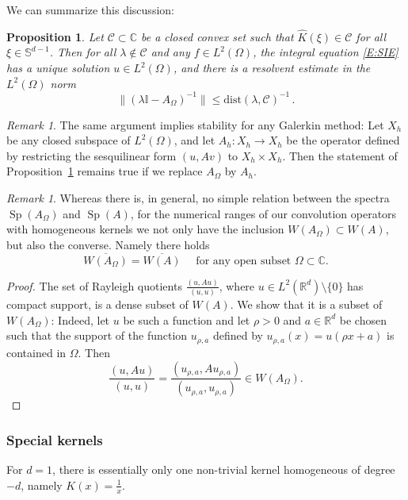\documentclass[12pt]{amsart}
\newtheorem{proposition}[theorem]{Proposition}
\theoremstyle{definition}
\theoremstyle{remark}
\newtheorem{remark}[theorem]{Remark}
\numberwithin{equation}{section}
\newcommand\C{{\mathbb C}}
\newcommand\R{{\mathbb R}}
\renewcommand\SS{{\mathbb S}}
\newcommand\cC{{\mathcal{C}}}
\newcommand {\Id}{\mathbb I}
\newcommand{\dist}{\mathrm{dist}}
\newcommand{\Sp}{\mathop{\mathrm{Sp}}\nolimits}
\let\hat=\widehat
\begin{document}
We can summarize this discussion:
\begin{proposition}
 \label{P:W(AOmega)}
 Let $\cC\subset\C$ be a closed convex set such that 
 $\hat K(\xi)\in \cC$ for all $\xi\in \SS^{d-1}$. Then for all $\lambda\not\in\cC$ and any $f\in L^{2}(\Omega)$, the integral equation \eqref{E:SIE} has a unique solution $u\in L^{2}(\Omega)$, and there is a resolvent estimate in the $L^{2}(\Omega)$ norm
\begin{equation}
\label{E:resAOmega}
 \|(\lambda\Id-A_{\Omega})^{-1}\| \le \dist(\lambda,\cC)^{-1}\,.
\end{equation}
\end{proposition}
\begin{remark}
 \label{R:StabGal}
The same argument implies stability for any Galerkin method: Let $X_{h}$ be any closed subspace of $L^{2}(\Omega)$, and let $A_{h}:X_{h}\to X_{h}$ be the operator defined by restricting the sesquilinear form $(u,Av)$ to $X_{h}\times X_{h}$. Then the statement of Proposition~\ref{P:W(AOmega)} remains true if we replace $A_{\Omega}$ by $A_{h}$.
\end{remark}
\begin{remark}
 \label{R:WAOmega=WA}
 Whereas there is, in general, no simple relation between the spectra $\Sp(A_{\Omega})$ and $\Sp(A)$, for the numerical ranges of our convolution operators with homogeneous kernels we not only have the inclusion
 $W(A_{\Omega})\subset W(A)$, but also the converse. Namely there holds
 \begin{equation}
\label{E:WAOmega=WA}
  \overline{W(A_{\Omega})} = \overline{W(A)}\quad\mbox{ for any open subset $\Omega\subset\C$.}
 \end{equation}
\begin{proof}
  The set of Rayleigh quotients $\frac{(u,Au)}{(u,u)}$, where 
  $u\in L^{2}(\R^{d})\setminus\{0\}$ has compact support, is a dense subset of $W(A)$. 
 We show that it is a subset of $W(A_{\Omega})$: Indeed,
  let $u$ be such a function and let $\rho>0$ and $a\in\R^{d}$ be chosen such that the support of the function 
$u_{\rho,a}$ defined by
$u_{\rho,a}(x)=u(\rho x +a)$ is contained in $\Omega$. Then
$$
\frac{(u,Au)}{(u,u)}=\frac{(u_{\rho,a},Au_{\rho,a})}{(u_{\rho,a},u_{\rho,a})}\in W(A_{\Omega}).
$$
\end{proof}
\end{remark}


\subsubsection{Special kernels}\label{SSS:Specific}
For $d=1$, there is essentially only one non-trivial kernel homogeneous of degree $-d$, namely $K(x)=\frac1x$.
\end{document}
